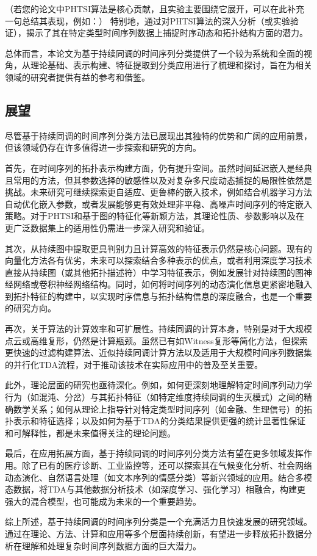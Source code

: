 （若您的论文中PHTSI算法是核心贡献，且实验主要围绕它展开，可以在此补充一句总结其表现，例如：）
特别地，通过对PHTSI算法的深入分析（或实验验证），揭示了其在特定类型时间序列数据上捕捉时序动态和拓扑结构方面的潜力。

总体而言，本论文为基于持续同调的时间序列分类提供了一个较为系统和全面的视角，从理论基础、表示构建、特征提取到分类应用进行了梳理和探讨，旨在为相关领域的研究者提供有益的参考和借鉴。

\subsection{展望}
尽管基于持续同调的时间序列分类方法已展现出其独特的优势和广阔的应用前景，但该领域仍存在许多值得进一步探索和研究的方向。

首先，在时间序列的拓扑表示构建方面，仍有提升空间。虽然时间延迟嵌入是经典且常用的方法，但其参数选择的敏感性以及对复杂多尺度动态捕捉的局限性依然是挑战。未来研究可继续探索更自适应、更鲁棒的嵌入技术，例如结合机器学习方法自动优化嵌入参数，或者发展能够更有效处理非平稳、高噪声时间序列的特定嵌入策略。对于PHTSI和基于图的特征化等新颖方法，其理论性质、参数影响以及在更广泛数据集上的适用性仍需进一步深入研究和验证。

其次，从持续图中提取更具判别力且计算高效的特征表示仍然是核心问题。现有的向量化方法各有优劣，未来可以探索结合多种表示的优点，或者利用深度学习技术直接从持续图（或其他拓扑描述符）中学习特征表示，例如发展针对持续图的图神经网络或卷积神经网络结构。同时，如何将时间序列的动态演化信息更紧密地融入到拓扑特征的构建中，以实现时序信息与拓扑结构信息的深度融合，也是一个重要的研究方向。

再次，关于算法的计算效率和可扩展性。持续同调的计算本身，特别是对于大规模点云或高维复形，仍然是计算瓶颈。虽然已有如Witness复形等简化方法，但探索更快速的过滤构建算法、近似持续同调计算方法以及适用于大规模时间序列数据集的并行化TDA流程，对于推动该技术在实际应用中的普及至关重要。

此外，理论层面的研究也亟待深化。例如，如何更深刻地理解特定时间序列动力学行为（如混沌、分岔）与其拓扑特征（如特定维度持续同调的生灭模式）之间的精确数学关系；如何从理论上指导针对特定类型时间序列（如金融、生理信号）的拓扑表示和特征选择；以及如何为基于TDA的分类结果提供更强的统计显著性保证和可解释性，都是未来值得关注的理论问题。

最后，在应用拓展方面，基于持续同调的时间序列分类方法有望在更多领域发挥作用。除了已有的医疗诊断、工业监控等，还可以探索其在气候变化分析、社会网络动态演化、自然语言处理（如文本序列的情感分类）等新兴领域的应用。结合多模态数据，将TDA与其他数据分析技术（如深度学习、强化学习）相融合，构建更强大的混合模型，也可能成为未来的一个重要趋势。

综上所述，基于持续同调的时间序列分类是一个充满活力且快速发展的研究领域。通过在理论、方法、计算和应用等多个层面持续创新，有望进一步释放拓扑数据分析在理解和处理复杂时间序列数据方面的巨大潜力。

